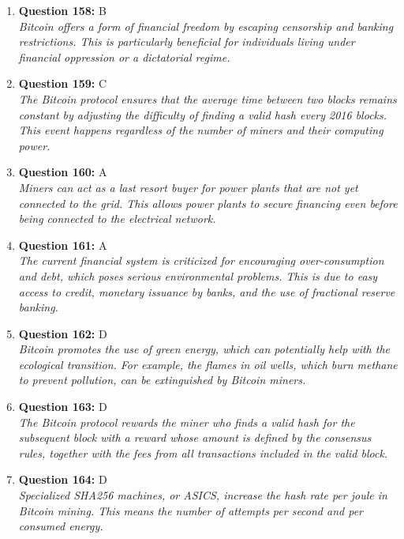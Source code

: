 \documentclass[12pt,a4paper]{article}
\begin{document}
\begin{enumerate}
\item \textbf{Question 158:} B
\\ \textit{Bitcoin offers a form of financial freedom by escaping censorship and banking restrictions. This is particularly beneficial for individuals living under financial oppression or a dictatorial regime.}

\item \textbf{Question 159:} C
\\ \textit{The Bitcoin protocol ensures that the average time between two blocks remains constant by adjusting the difficulty of finding a valid hash every 2016 blocks. This event happens regardless of the number of miners and their computing power.}

\item \textbf{Question 160:} A
\\ \textit{Miners can act as a last resort buyer for power plants that are not yet connected to the grid. This allows power plants to secure financing even before being connected to the electrical network.}

\item \textbf{Question 161:} A
\\ \textit{The current financial system is criticized for encouraging over-consumption and debt, which poses serious environmental problems. This is due to easy access to credit, monetary issuance by banks, and the use of fractional reserve banking.}

\item \textbf{Question 162:} D
\\ \textit{Bitcoin promotes the use of green energy, which can potentially help with the ecological transition. For example, the flames in oil wells, which burn methane to prevent pollution, can be extinguished by Bitcoin miners.}

\item \textbf{Question 163:} D
\\ \textit{The Bitcoin protocol rewards the miner who finds a valid hash for the subsequent block with a reward whose amount is defined by the consensus rules, together with the fees from all transactions included in the valid block.}

\item \textbf{Question 164:} D
\\ \textit{Specialized SHA256 machines, or ASICS, increase the hash rate per joule in Bitcoin mining. This means the number of attempts per second and per consumed energy.}


\end{enumerate}
\end{document}
